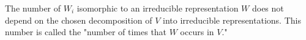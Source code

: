 The number of $W_i$ isomorphic to an irreducible representation $W$ does not depend on the chosen decomposition of $V$ into irreducible representations. This number is called the "number of times that $W$ occurs in $V$."
